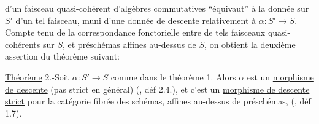 d'un faisceau quasi-cohérent d'algèbres commutatives ``équivaut'' à la donnée sur $S'$ d'un tel faisceau, muni d'une donnée de descente relativement à $\alpha:S'\longrightarrow S$.   Compte tenu de la correspondance fonctorielle entre de tels faisceaux quasi-cohérents sur $S$, et  préschémas  affines au-dessus de $S$, on obtient la deuxième assertion du théorème suivant:

\uline{Théorème} 2.-Soit $\alpha:S'\longrightarrow S$  comme dans le théorème 1. Alors $\alpha$ est un \uline{morphisme de descente} (pas strict en général) (, déf 2.4.), et c'est un \uline{morphisme de descente strict} pour la catégorie fibrée des schémas, affines au-dessus de préschémas, (, déf 1.7).


